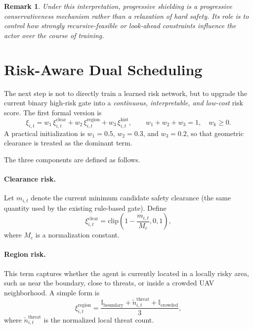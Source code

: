 \documentclass[11pt]{article}
\newtheorem{remark}{Remark}
\begin{document}
\begin{remark}
Under this interpretation, progressive shielding is a \emph{progressive conservativeness} mechanism rather than a relaxation of hard safety. Its role is to control how strongly recursive-feasible or look-ahead constraints influence the actor over the course of training.
\end{remark}


\section{Risk-Aware Dual Scheduling}

The next step is not to directly train a learned risk network, but to upgrade the current binary high-risk gate into a \emph{continuous, interpretable, and low-cost} risk score. The first formal version is
\begin{equation}
\xi_{i,t} = w_1 \, \xi_{i,t}^{\mathrm{clear}} + w_2 \, \xi_{i,t}^{\mathrm{region}} + w_3 \, \xi_{i,t}^{\mathrm{hist}},
\qquad
w_1+w_2+w_3=1,
\quad w_k\ge 0.
\end{equation}
A practical initialization is $w_1=0.5$, $w_2=0.3$, and $w_3=0.2$, so that geometric clearance is treated as the dominant term.

The three components are defined as follows.

\paragraph{Clearance risk.}
Let $m_{i,t}$ denote the current minimum candidate safety clearance (the same quantity used by the existing rule-based gate). Define
\begin{equation}
\xi_{i,t}^{\mathrm{clear}}
=
\mathrm{clip}\left(1-\frac{m_{i,t}}{M_c},0,1\right),
\end{equation}
where $M_c$ is a normalization constant.

\paragraph{Region risk.}
This term captures whether the agent is currently located in a locally risky area, such as near the boundary, close to threats, or inside a crowded UAV neighborhood. A simple form is
\begin{equation}
\xi_{i,t}^{\mathrm{region}}
=
\frac{\mathbb I_{\mathrm{boundary}} + \tilde n^{\mathrm{threat}}_{i,t} + \mathbb I_{\mathrm{crowded}}}{3},
\end{equation}
where $\tilde n^{\mathrm{threat}}_{i,t}$ is the normalized local threat count.
\end{document}
